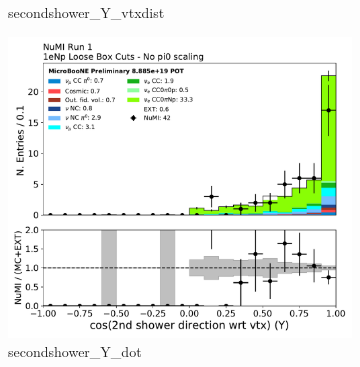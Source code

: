 \begin{figure}[H]
\begin{subfigure}{0.3\textwidth}
    \caption{secondshower\_Y\_vtxdist}
    \end{subfigure}
    \begin{subfigure}{0.3\textwidth}
    \includegraphics[width=1.0\textwidth]{Sidebands/Figures/NuMI/1eNp/secondshower_Y_dot.pdf}
    \caption{secondshower\_Y\_dot}
    \end{subfigure}
    \caption{} 
    \label{fig:NuMI_1eNp_4}
\end{figure}

